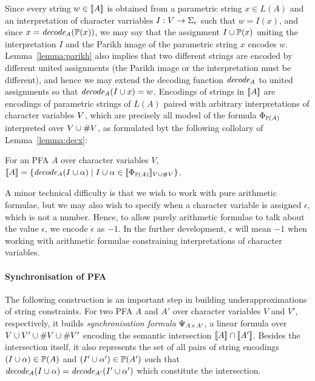 \documentclass[sigplan,review,anonymous]{acmart}\settopmatter{printfolios=true,printccs=false,printacmref=false}
\begin{document}
Since every string $w \in [\![A]\!]$ is obtained from a parametric string $x\in L(A)$ and an interpretation of character varriables $I:V\rightarrow\Sigma_\epsilon$ such that $w = I(x)$, and since $x = \mathit{decode_{A}}(\mathbb{P}{(x)})$, 
we may say that the assignment $I \cup \mathbb{P}{(x)}$ uniting the interpretation $I$ and the Parikh image of the parametric string $x$ encodes $w$. Lemma~\ref{lemma:parikh} also implies that two different strings are encoded by different united assignments (the Parikh image or the interpretation must be different), and hence we may extend the decoding function $\mathit{decode_{A}}$ to united assignments so that $\mathit{decode_{A}}(I \cup x) = w$.
Encodings of strings in $[\![A]\!]$ are encodings of parametric strings of $L(A)$ paired with arbitrary interpretations of character variables $V$, which are precisely all modesl of the formula $\Phi_{\mathbb{P}{(A)}}$ interpreted over $V\cup\#{V}$, as formulated byt the following collolary of Lemma~\ref{lemma:decx}:
%
\begin{corollary}
For an PFA $A$ over character variables $V$,
$[\![A]\!] = \{\mathit{decode_{A}}(I\cup \alpha) \mid I\cup\alpha\in[\![\Phi_{\mathbb{P}{(A)}}]\!]_{V\cup\#{V}}\}$.
\end{corollary}
%
A minor technical difficulty is that we wish to work with pure arithmetic formulae, 
but we may also wish to specify when a character variable is assigned $\epsilon$, which is not a number. 
Hence, to allow purely arithmetic formulae to talk about the value $\epsilon$, we encode $\epsilon$ as $-1$.
In the further development, $\epsilon$ will mean $-1$ when working with arithmetic formulae constraining interpretations of character variables.

\paragraph{Synchronisation of PFA}
The following construction is an important step in building underapproximations of string constraints. 
For two PFA $A$ and $A'$ over character variables $V$ and $V'$, respectively, 
it builds \emph{synchronisation formula} $\Psi_{A \times A'}$, a linear formula over $V\cup V' \cup \#{V}\cup\#{V'}$ encoding the semantic intersection $[\![A]\!] \cap [\![A']\!]$. 
Besides the intersection itself, it also represents the set of all pairs of string encodings $(I\cup \alpha)\in \mathbb{P}{(A)}$ and $(I'\cup \alpha')\in\mathbb{P}{(A')}$ such that 
$\mathit{decode_{A}}(I\cup \alpha) = \mathit{decode_{A'}}(I'\cup \alpha')$ which constitute the intersection.
\end{document}

